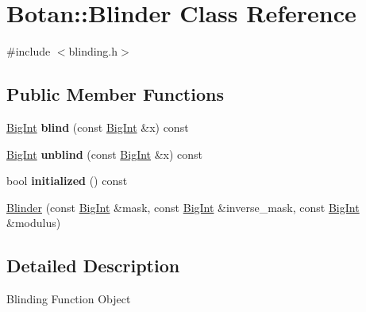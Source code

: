 \hypertarget{classBotan_1_1Blinder}{\section{Botan\-:\-:Blinder Class Reference}
\label{classBotan_1_1Blinder}
}


{\ttfamily \#include $<$blinding.\-h$>$}

\subsection*{Public Member Functions}
\begin{DoxyCompactItemize}
\item 
\hypertarget{classBotan_1_1Blinder_a3237fff7a0d5844056354aaba3f95cff}{\hyperlink{classBotan_1_1BigInt}{Big\-Int} {\bfseries blind} (const \hyperlink{classBotan_1_1BigInt}{Big\-Int} \&x) const }\label{classBotan_1_1Blinder_a3237fff7a0d5844056354aaba3f95cff}

\item 
\hypertarget{classBotan_1_1Blinder_a1e037f5801fd3d6b85c625c67c162d20}{\hyperlink{classBotan_1_1BigInt}{Big\-Int} {\bfseries unblind} (const \hyperlink{classBotan_1_1BigInt}{Big\-Int} \&x) const }\label{classBotan_1_1Blinder_a1e037f5801fd3d6b85c625c67c162d20}

\item 
\hypertarget{classBotan_1_1Blinder_aee134fd3675c18a5cc992c685d7ae89c}{bool {\bfseries initialized} () const }\label{classBotan_1_1Blinder_aee134fd3675c18a5cc992c685d7ae89c}

\item 
\hyperlink{classBotan_1_1Blinder_ad04b46f0c2f34bb6b5697b2d75fdc403}{Blinder} (const \hyperlink{classBotan_1_1BigInt}{Big\-Int} \&mask, const \hyperlink{classBotan_1_1BigInt}{Big\-Int} \&inverse\-\_\-mask, const \hyperlink{classBotan_1_1BigInt}{Big\-Int} \&modulus)
\end{DoxyCompactItemize}


\subsection{Detailed Description}
Blinding Function Object 

